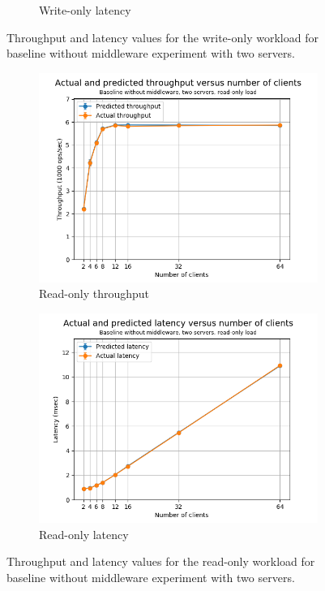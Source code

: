 \documentclass[11pt,a4paper]{article}
\begin{document}
\begin{figure}[h]
\begin{subfigure}{.5\textwidth}
  \caption{Write-only latency}
  \label{fig:csb2-wo-law_lat}
\end{subfigure}
\caption{Throughput and latency values for the write-only workload for baseline without middleware experiment with two servers.}
\label{fig:csb2-wo-law}
\end{figure}

\begin{figure}[h]
\centering
\begin{subfigure}{.5\textwidth}
  \centering
  \includegraphics[width=1.0\linewidth,trim={0px 0px 0px 0px},clip]{img/plot/csb2-ro-law_tpt.png}
  \caption{Read-only throughput}
  \label{fig:csb2-ro-law_tpt}
\end{subfigure}%
\begin{subfigure}{.5\textwidth}
  \centering
  \includegraphics[width=1.0\linewidth,trim={0px 0px 0px 0px},clip]{img/plot/csb2-ro-law_lat.png}
  \caption{Read-only latency}
  \label{fig:csb2-ro-law_lat}
\end{subfigure}
\caption{Throughput and latency values for the read-only workload for baseline without middleware experiment with two servers.}
\label{fig:csb2-ro-law}
\end{figure}
\end{document}
